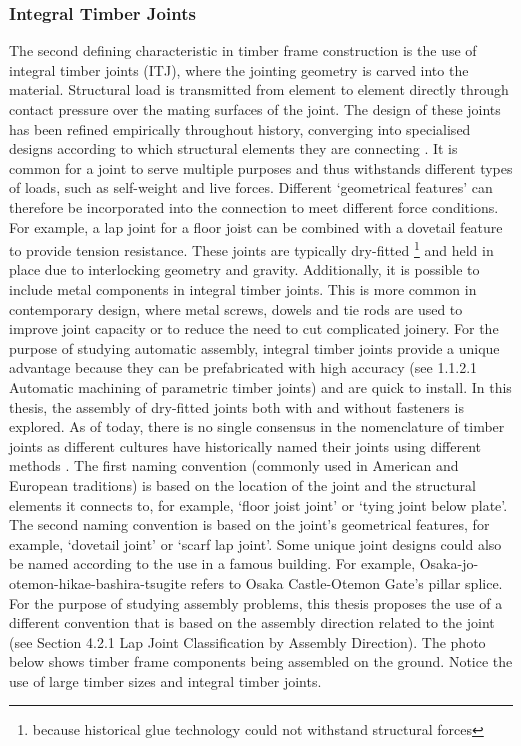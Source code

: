 \subsubsection{Integral Timber Joints}
\label{subsec:timberframeconstruction/integraltimberjoints}

The second defining characteristic in timber frame construction is the use of integral timber joints (ITJ), where the jointing geometry is carved into the material. Structural load is transmitted from element to element directly through contact pressure over the mating surfaces of the joint. The design of these joints has been refined empirically throughout history, converging into specialised designs according to which structural elements they are connecting \autocite{jacksobonHistoricAmericanTimber2014}. It is common for a joint to serve multiple purposes and thus withstands different types of loads, such as self-weight and live forces. Different ‘geometrical features’ can therefore be incorporated into the connection to meet different force conditions. For example, a lap joint for a floor joist can be combined with a dovetail feature to provide tension resistance.
These joints are typically dry-fitted \footnote{because historical glue technology could not withstand structural forces} and held in place due to interlocking geometry and gravity.
Additionally, it is possible to include metal components in integral timber joints.
This is more common in contemporary design, where metal screws, dowels and tie rods are used to improve joint capacity or to reduce the need to cut complicated joinery.
For the purpose of studying automatic assembly, integral timber joints provide a unique advantage because they can be prefabricated with high accuracy (see 1.1.2.1 Automatic machining of parametric timber joints) and are quick to install.
In this thesis, the assembly of dry-fitted joints both with and without fasteners is explored.
As of today, there is no single consensus in the nomenclature of timber joints as different cultures have historically named their joints using different methods \parencite{satoCompleteJapaneseJoinery1995,seikeArtJapaneseJoinery1977a,sumiyoshiWoodJointsClassical1991}. The first naming convention (commonly used in American and European traditions) is based on the location of the joint and the structural elements it connects to, for example, ‘floor joist joint’ or ‘tying joint below plate’. The second naming convention is based on the joint's geometrical features, for example, ‘dovetail joint’ or ‘scarf lap joint’. Some unique joint designs could also be named according to the use in a famous building. For example, Osaka-jo-otemon-hikae-bashira-tsugite refers to Osaka Castle-Otemon Gate's pillar splice. For the purpose of studying assembly problems, this thesis proposes the use of a different convention that is based on the assembly direction related to the joint (see Section 4.2.1 Lap Joint Classification by Assembly Direction).
The photo below shows timber frame components being assembled on the ground. Notice the use of large timber sizes and integral timber joints. 

